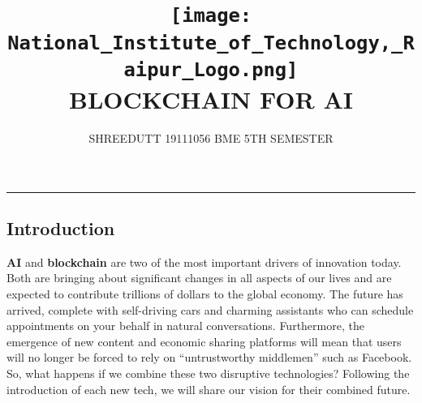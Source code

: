 \documentclass[12pt,letterpaper]{article}
\begin{document}
\title{
\texttt{[image: National\_Institute\_of\_Technology,\_Raipur\_Logo.png]}
\\ 
\textbf{BLOCKCHAIN FOR AI}
}
\author{SHREEDUTT 19111056 BME 5TH SEMESTER}
\maketitle
\rule{\textwidth}{0.5pt}

\subsection* {Introduction} 
\textbf{AI} and \textbf{blockchain} are two of the most important drivers of innovation today. Both are bringing about significant changes in all aspects of our lives and are expected to contribute trillions of dollars to the global economy. The future has arrived, complete with self-driving cars and charming assistants who can schedule appointments on your behalf in natural conversations. Furthermore, the emergence of new content and economic sharing platforms will mean that users will no longer be forced to rely on “untrustworthy middlemen” such as Facebook. So, what happens if we combine these two disruptive technologies? Following the introduction of each new tech, we will share our vision for their combined future.
\end{document}
